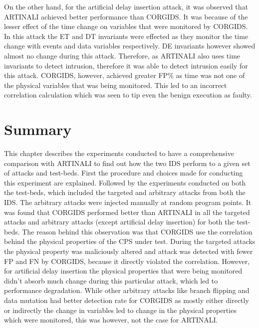 On the other hand, for the artificial delay insertion attack, it was observed that ARTINALI achieved better performance than \ac{CORGIDS}. It was because of the lesser effect of the time change on variables that were monitored by \ac{CORGIDS}. In this attack the E\textbar T and D\textbar T invariants were effected as they monitor the time change with events and data variables respectively. D\textbar E invariants however showed almost no change during this attack. Therefore, as ARTINALI also uses time invariants to detect intrusion, therefore it was able to detect intrusion easily for this attack. \ac{CORGIDS}, however, achieved greater \ac{FP}\% as time was not one of the physical variables that was being monitored. This led to an incorrect correlation calculation which was seen to tip even the benign execution as faulty.

\section{Summary}
This chapter describes the experiments conducted to have a comprehensive comparison with ARTINALI to find out how the two \ac{IDS} perform to a given set of attacks and test-beds. First the procedure and choices made for conducting this experiment are explained. Followed by the experiments conducted on both the test-beds, which included the targeted and arbitrary attacks from both the \ac{IDS}. The arbitrary attacks were injected manually at random program points. It was found that \ac{CORGIDS} performed better than ARTINALI in all the targeted attacks and arbitrary attacks (except artificial delay insertion) for both the test-beds. The reason behind this observation was that \ac{CORGIDS} use the correlation behind the physical properties of the \ac{CPS} under test. During the targeted attacks the physical property was maliciously altered and attack was detected with fewer \ac{FP} and \ac{FN} by \ac{CORGIDS}, because it directly violated the correlation. However, for artificial delay insertion the physical properties that were being monitored didn't absorb much change during this particular attack, which led to performance degradation. While other arbitrary attacks like branch flipping and data mutation had better detection rate for \ac{CORGIDS} as mostly either directly or indirectly the change in variables led to change in the physical properties which were monitored, this was however, not the case for ARTINALI.



\endinput
